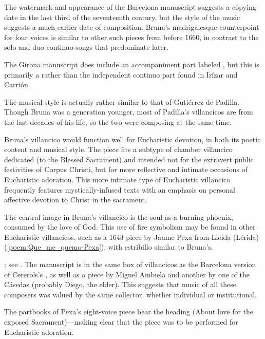 The watermark and appearance of the Barcelona manuscript suggests a copying date
in the last third of the seventeenth century, but the style of the music
suggests a much earlier date of composition.  
Bruna's madrigalesque counterpoint for four voices is similar to other such
pieces from before 1660, in contrast to the solo and duo continuo-songs that
predominate later.%
\begin{Footnote}
    The Girona manuscript does include an accompaniment part labeled
    , but this is primarily a  rather
    than the independent continuo part found in Irízar and Carrión.
\end{Footnote}
The musical style is actually rather similar to that of Gutiérrez de Padilla. 
Though Bruna was a generation younger, most of Padilla's villancicos are from
the last decades of his life, so the two were composing at the same time.

Bruna's villancico would function well for Eucharistic devotion, in both its
poetic content and musical style.  
The piece fits a subtype of chamber villancico dedicated  (to the Blessed Sacrament) and intended not for the extravert public
festivities of Corpus Christi, but for more reflective and intimate occasions of
Eucharistic adoration.
This more intimate type of Eucharistic villancico frequently features
mystically-infused texts with an emphasis on personal affective devotion to
Christ in the sacrament.  

The central image in Bruna's villancico is the soul as a burning phoenix,
consumed by the love of God.
This use of fire symbolism may be found in other Eucharistic villancicos, such
as a 1643 piece by Jaume Pexa from Lleida (Lérida)
(\cref{poem:Que_me_quemo-Pexa}), with estribillo similar to Bruna's.%
\begin{Footnote}
    ; see .
    The manuscript is in the same box of villancicos as the Barcelona version of
    Cererols's , as well as a piece by Miguel Ambiela
    and another by one of the Cásedas (probably Diego, the elder).  
    This suggests that music of all these composers was valued by the same
    collector, whether individual or institutional.
\end{Footnote}
The partbooks of Pexa's eight-voice piece bear the heading  (About love for the exposed Sacrament)---making clear that
the piece was to be performed for Eucharistic adoration.  

